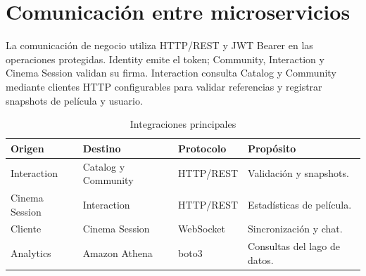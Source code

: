 \chapter{Comunicación entre microservicios}
La comunicación de negocio utiliza HTTP/REST y JWT Bearer en las operaciones protegidas. Identity emite el token; Community, Interaction y Cinema Session validan su firma. Interaction consulta Catalog y Community mediante clientes HTTP configurables para validar referencias y registrar snapshots de película y usuario.
\begin{table}[H]\centering\small\caption{Integraciones principales}\begin{tabularx}{\textwidth}{p{}p{}p{}X}\toprule Origen&Destino&Protocolo&Propósito\\\midrule Interaction&Catalog y Community&HTTP/REST&Validación y snapshots.\\Cinema Session&Interaction&HTTP/REST&Estadísticas de película.\\Cliente&Cinema Session&WebSocket&Sincronización y chat.\\Analytics&Amazon Athena&boto3&Consultas del lago de datos.\\\bottomrule\end{tabularx}\end{table}

